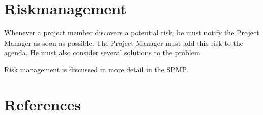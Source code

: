 \documentclass[salesmen, twoside]{../../../templates/latex/2009/softproj}
\begin{document}
\begin{projdoc}
\chapter{Riskmanagement}
Whenever a project member discovers a potential risk, he must notify the Project Manager as soon as possible. The Project Manager must add this risk to the agenda. He must also consider several solutions to the problem.

Risk management is discussed in more detail in the SPMP.

\chapter{References}
\end{projdoc}
\end{document}
